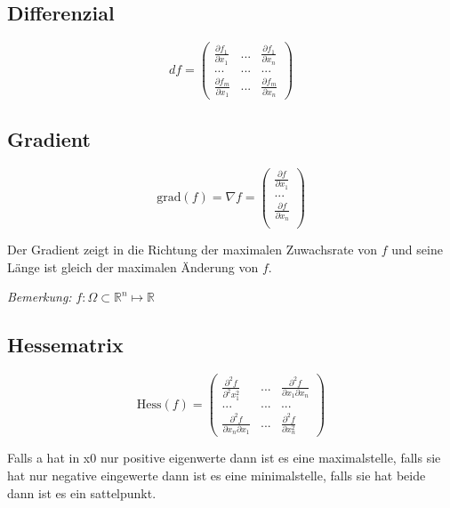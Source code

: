 \documentclass[11pt]{article}
\begin{document}
\subsection{Differenzial}

\begin{equation*}
	df = \begin{pmatrix}
		\frac{\partial f_1}{\partial x_1} & ... & \frac{\partial f_1}{\partial x_n} \\
		... & ... & ... \\
		\frac{\partial f_m}{\partial x_1} & ... & \frac{\partial f_m}{\partial x_n}
	\end{pmatrix}
\end{equation*}

\subsection{Gradient}

\begin{equation*}
	\text{grad}(f)=\nabla f=
	\begin{pmatrix}
		\frac{\partial f}{\partial x_1}\\
		...\\
		\frac{\partial f}{\partial x_n}\\
	\end{pmatrix}
\end{equation*}

Der Gradient zeigt in die Richtung der maximalen Zuwachsrate von $f$ und seine Länge ist gleich der maximalen Änderung von $f$.

\emph{Bemerkung:} $f:\Omega \subset \mathbb{R}^n \mapsto \mathbb{R}$

\subsection{Hessematrix}

\begin{equation*}
	\text{Hess}(f)=
	\begin{pmatrix}
		\frac{\partial^2 f}{\partial^2x_1^2} & ... & \frac{\partial^2 f}{\partial x_1 \partial x_n}\\
		...&...&...\\
		\frac{\partial^2 f}{\partial x_n \partial x_1} & ... & \frac{\partial^2 f}{\partial x_n^2}
	\end{pmatrix}
\end{equation*}

Falls a hat in x0 nur positive eigenwerte dann ist es eine maximalstelle, falls sie hat nur negative eingewerte dann ist es eine minimalstelle, falls sie hat beide dann ist es ein sattelpunkt.
\end{document}
